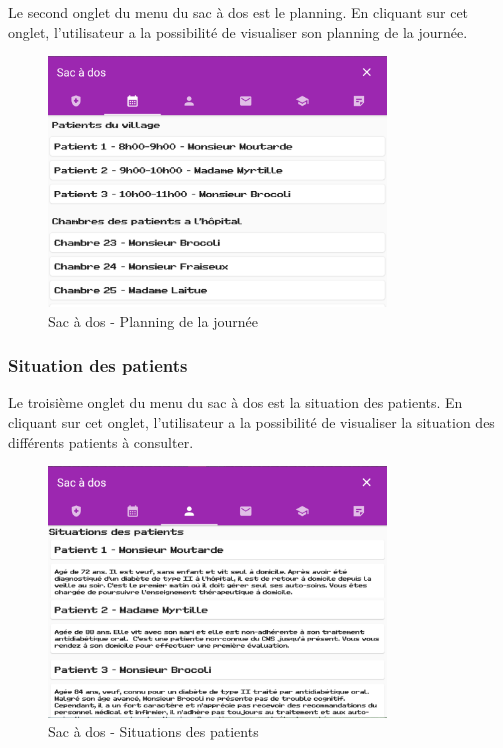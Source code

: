Le second onglet du menu du sac à dos est le planning. En cliquant sur cet onglet, l'utilisateur a la possibilité de visualiser son planning de la journée. \\

\begin{figure}[H]
    \centering
    \includegraphics[width=0.8\textwidth ]{images/toolsMenu/planning.png}
    \caption{Sac à dos - Planning de la journée}
    \label{fig:pic_dessus}
\end{figure}


\subsubsection*{Situation des patients}

Le troisième onglet du menu du sac à dos est la situation des patients. En cliquant sur cet onglet, l'utilisateur a la possibilité de visualiser la situation des différents patients à consulter. \\

\begin{figure}[H]
    \centering
    \includegraphics[width=0.8\textwidth ]{images/toolsMenu/situations.png}
    \caption{Sac à dos - Situations des patients}
    \label{fig:pic_dessus}
\end{figure}

